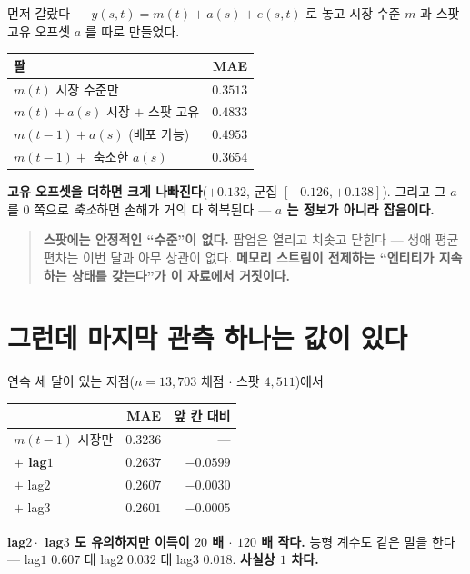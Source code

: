 \documentclass[11pt]{article}
\begin{document}
먼저 갈랐다 --- $y(s,t) = m(t) + a(s) + e(s,t)$ 로 놓고 시장 수준 $m$ 과
스팟 고유 오프셋 $a$ 를 따로 만들었다.

\begin{center}
\begin{tabular}{lr}
\hline
팔 & MAE \\
\hline
$m(t)$ 시장 수준만 & $\mathbf{0.3513}$ \\
$m(t)+a(s)$ 시장 $+$ 스팟 고유 & $0.4833$ \\
$m(t{-}1)+a(s)$ (배포 가능) & $0.4953$ \\
$m(t{-}1)+$ 축소한 $a(s)$ & $0.3654$ \\
\hline
\end{tabular}
\end{center}

\textbf{고유 오프셋을 더하면 크게 나빠진다}($+0.132$, 군집
$[+0.126,+0.138]$). 그리고 그 $a$ 를 $0$ 쪽으로 \emph{축소}하면 손해가
거의 다 회복된다 --- \textbf{$a$ 는 정보가 아니라 잡음이다.}

\begin{quote}
\textbf{스팟에는 안정적인 ``수준''이 없다.} 팝업은 열리고 치솟고 닫힌다 ---
생애 평균 편차는 이번 달과 아무 상관이 없다. \textbf{메모리 스트림이
전제하는 ``엔티티가 지속하는 상태를 갖는다''가 이 자료에서 거짓이다.}
\end{quote}

\section{그런데 마지막 관측 하나는 값이 있다}

연속 세 달이 있는 지점($n{=}13{,}703$ 채점 $\cdot$ 스팟 $4{,}511$)에서

\begin{center}
\begin{tabular}{lrr}
\hline
 & MAE & 앞 칸 대비 \\
\hline
$m(t{-}1)$ 시장만 & $0.3236$ & --- \\
\textbf{$+$ lag$1$} & $\mathbf{0.2637}$ & $\mathbf{-0.0599}$ \\
$+$ lag$2$ & $0.2607$ & $-0.0030$ \\
$+$ lag$3$ & $0.2601$ & $-0.0005$ \\
\hline
\end{tabular}
\end{center}

\textbf{lag$2 \cdot$ lag$3$ 도 유의하지만 이득이 $20$ 배 $\cdot$ $120$ 배
작다.} 능형 계수도 같은 말을 한다 --- lag$1$ $\mathbf{0.607}$ 대 lag$2$
$0.032$ 대 lag$3$ $0.018$. \textbf{사실상 $1$ 차다.}
\end{document}
